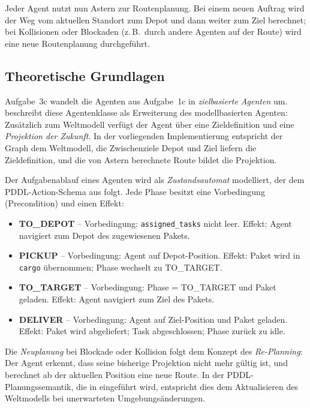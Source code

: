 Jeder Agent nutzt nun \acs{Astern} zur Routenplanung. Bei einem neuen Auftrag wird der Weg vom aktuellen Standort zum Depot und dann weiter zum Ziel berechnet; bei Kollisionen oder Blockaden (z.\,B.\ durch andere Agenten auf der Route) wird eine neue Routenplanung durchgeführt.

\subsection{Theoretische Grundlagen}

Aufgabe~3c wandelt die Agenten aus Aufgabe~1c in \textit{zielbasierte Agenten} um. \textcite[S. 24\,f., Abb.~1.7]{5} beschreibt diese Agentenklasse als Erweiterung des modellbasierten Agenten: Zusätzlich zum Weltmodell verfügt der Agent über eine Zieldefinition und eine \textit{Projektion der Zukunft}. In der vorliegenden Implementierung entspricht der Graph dem Weltmodell, die Zwischenziele Depot und Ziel liefern die Zieldefinition, und die von \acs{Astern} berechnete Route bildet die Projektion.

Der Aufgabenablauf eines Agenten wird als \textit{Zustandsautomat} modelliert, der dem PDDL-Action-Schema aus \textcite[S. 25\,f.]{5} folgt. Jede Phase besitzt eine Vorbedingung (Precondition) und einen Effekt:
\begin{itemize}
    \item \textbf{TO\_DEPOT} -- Vorbedingung: \texttt{assigned\_tasks} nicht leer. Effekt: Agent navigiert zum Depot des zugewiesenen Pakets.
    \item \textbf{PICKUP} -- Vorbedingung: Agent auf Depot-Position. Effekt: Paket wird in \texttt{cargo} übernommen; Phase wechselt zu TO\_TARGET.
    \item \textbf{TO\_TARGET} -- Vorbedingung: Phase = TO\_TARGET und Paket geladen. Effekt: Agent navigiert zum Ziel des Pakets.
    \item \textbf{DELIVER} -- Vorbedingung: Agent auf Ziel-Position und Paket geladen. Effekt: Paket wird abgeliefert; Task abgeschlossen; Phase zurück zu idle.
\end{itemize}

Die \textit{Neuplanung} bei Blockade oder Kollision folgt dem Konzept des \textit{Re-Planning}: Der Agent erkennt, dass seine bisherige Projektion nicht mehr gültig ist, und berechnet ab der aktuellen Position eine neue Route. In der PDDL-Planungssemantik, die in \textcite[S. 25\,f.]{5} eingeführt wird, entspricht dies dem Aktualisieren des Weltmodells bei unerwarteten Umgebungsänderungen.

